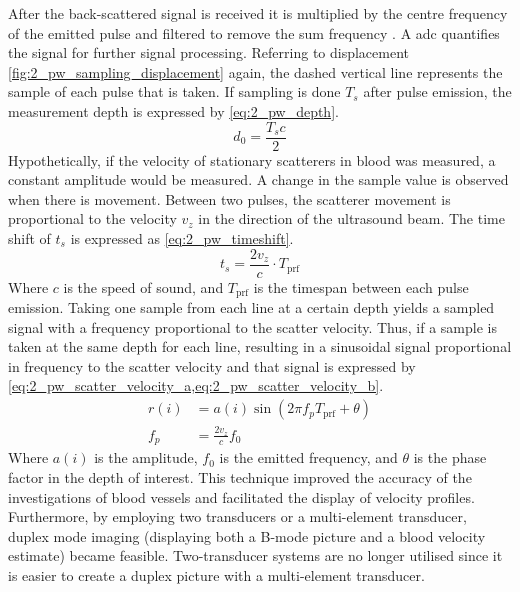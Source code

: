 After the back-scattered signal is received it is multiplied by the centre frequency of the emitted pulse and filtered to remove the sum frequency \cite{JensenUltrasoundBook}. A \gls{adc} quantifies the signal for further signal processing. Referring to displacement \cref{fig:2_pw_sampling_displacement} again, the dashed vertical line represents the sample of each pulse that is taken. If sampling is done $T_{s}$ after pulse emission, the measurement depth is expressed by \cref{eq:2_pw_depth}.
\begin{equation} \label{eq:2_pw_depth}
	d_{0} = \frac{T_{s}c}{2}
\end{equation}
Hypothetically, if the velocity of stationary scatterers in blood was measured, a constant amplitude would be measured. A change in the sample value is observed when there is movement. Between two pulses, the scatterer movement is proportional to the velocity $v_{z}$ in the direction of the ultrasound beam. The time shift of $t_{s}$ is expressed as \cref{eq:2_pw_timeshift}.
\begin{equation} \label{eq:2_pw_timeshift}
	t_{s} = \frac{2v_{z}}{c}\cdot T_{\mathrm{prf}}
\end{equation}
Where $c$ is the speed of sound, and $T_{\mathrm{prf}}$ is the timespan between each pulse emission. Taking one sample from each line at a certain depth yields a sampled signal with a frequency proportional to the scatter velocity. Thus, if a sample is taken at the same depth for each line, resulting in a sinusoidal signal proportional in frequency to the scatter velocity \cite{Munk_Thesis} and that signal is expressed by \cref{eq:2_pw_scatter_velocity_a,eq:2_pw_scatter_velocity_b}.
\begin{subequations}
	\begin{align}
		r(i) &= a(i) \sin \left( 2\pi f_{p} T_{\mathrm{prf}} + \theta \right) \label{eq:2_pw_scatter_velocity_a} \\
		f_{p} &= \frac{2 v_{z}}{c} f_{0} \label{eq:2_pw_scatter_velocity_b}
	\end{align}
\end{subequations}
Where $a(i)$ is the amplitude, $f_{0}$ is the emitted frequency, and $\theta$ is the phase factor in the depth of interest. This technique improved the accuracy of the investigations of blood vessels and facilitated the display of velocity profiles. Furthermore, by employing two transducers or a multi-element transducer, duplex mode imaging (displaying both a B-mode picture and a blood velocity estimate) became feasible. Two-transducer systems are no longer utilised since it is easier to create a duplex picture with a multi-element transducer.

